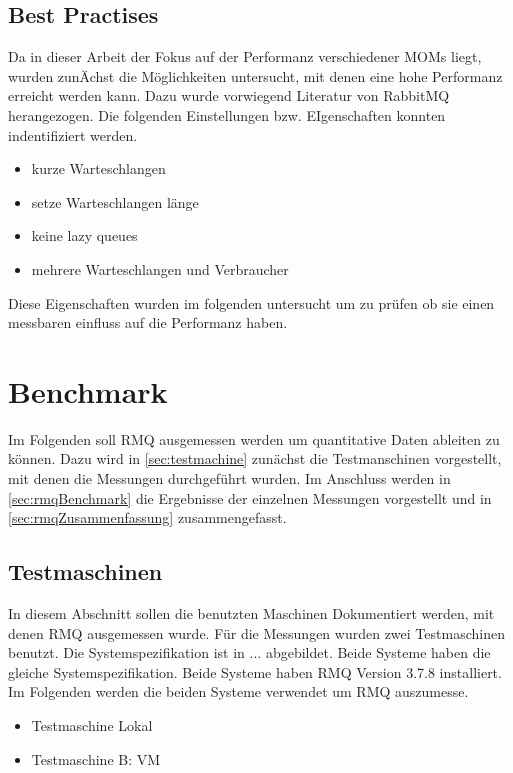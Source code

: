 \subsection{Best Practises}
Da in dieser Arbeit der Fokus auf der Performanz verschiedener MOMs liegt, wurden zunÄchst die Möglichkeiten untersucht, mit denen eine hohe Performanz erreicht werden kann. Dazu wurde vorwiegend Literatur von RabbitMQ herangezogen. Die folgenden Einstellungen bzw. EIgenschaften konnten indentifiziert werden.
\begin{itemize}
    \item kurze Warteschlangen
    \item setze Warteschlangen länge
    \item keine lazy queues
    \item mehrere Warteschlangen und Verbraucher
\end{itemize}
Diese Eigenschaften wurden im folgenden untersucht um zu prüfen ob sie einen messbaren einfluss auf die Performanz haben.

\section{Benchmark}
Im Folgenden soll RMQ ausgemessen werden um quantitative Daten ableiten zu können. Dazu wird in \autoref{sec:testmachine} zunächst die Testmanschinen vorgestellt, mit denen die Messungen durchgeführt wurden. Im Anschluss werden in \autoref{sec:rmqBenchmark} die Ergebnisse der einzelnen Messungen vorgestellt und in \autoref{sec:rmqZusammenfassung} zusammengefasst.

\subsection{Testmaschinen}
\label{sec:testmachine}
In diesem Abschnitt sollen die benutzten Maschinen Dokumentiert werden, mit denen RMQ ausgemessen wurde. Für die Messungen wurden zwei Testmaschinen benutzt. Die Systemspezifikation ist in ... abgebildet. Beide Systeme haben die gleiche Systemspezifikation. Beide Systeme haben RMQ Version 3.7.8 installiert. Im Folgenden werden die beiden Systeme verwendet um RMQ auszumesse.
\begin{itemize}
    \item Testmaschine Lokal
    \item Testmaschine B: VM
\end{itemize}


